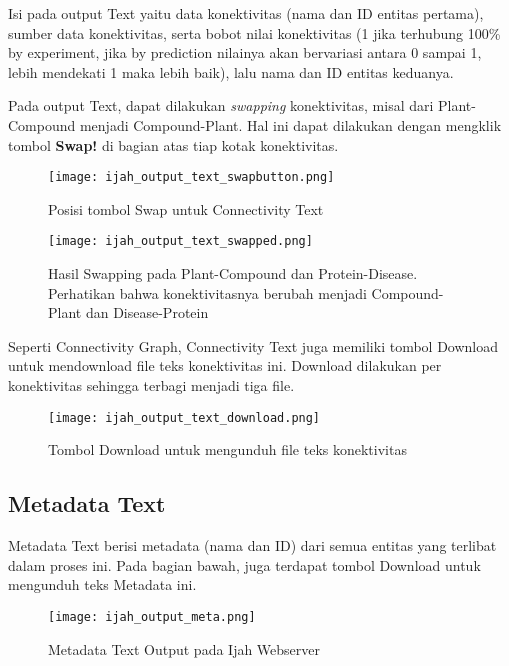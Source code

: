 	Isi pada output Text yaitu data konektivitas (nama dan ID entitas pertama), sumber data konektivitas, serta bobot nilai konektivitas (1 jika terhubung 100\% by experiment, jika by prediction nilainya akan bervariasi antara 0 sampai 1, lebih mendekati 1 maka lebih baik), lalu nama dan ID entitas keduanya.

	Pada output Text, dapat dilakukan \emph{swapping} konektivitas, misal dari Plant-Compound menjadi Compound-Plant. Hal ini dapat dilakukan dengan mengklik tombol \textbf{Swap!} di bagian atas tiap kotak konektivitas.

	\begin{figure}[H]
	\centering
	\texttt{[image: ijah\_output\_text\_swapbutton.png]}
	\caption{Posisi tombol Swap untuk Connectivity Text}
	\label{fig:ijah_output_text_swapbutton}
	\end{figure}

	\begin{figure}[H]
	\centering
	\texttt{[image: ijah\_output\_text\_swapped.png]}
	\caption{Hasil Swapping pada Plant-Compound dan Protein-Disease. Perhatikan bahwa konektivitasnya berubah menjadi Compound-Plant dan Disease-Protein}
	\label{fig:ijah_output_text_swapped}
	\end{figure}

	Seperti Connectivity Graph, Connectivity Text juga memiliki tombol Download untuk mendownload file teks konektivitas ini. Download dilakukan per konektivitas sehingga terbagi menjadi tiga file.

	\begin{figure}[H]
	\centering
	\texttt{[image: ijah\_output\_text\_download.png]}
	\caption{Tombol Download untuk mengunduh file teks konektivitas}
	\label{fig:ijah_output_text_download}
	\end{figure}
	
	\subsection{Metadata Text} \label{meta}
	Metadata Text berisi metadata (nama dan ID) dari semua entitas yang terlibat dalam proses ini. Pada bagian bawah, juga terdapat tombol Download untuk mengunduh teks Metadata ini.

	\begin{figure}[H]
	\centering
	\texttt{[image: ijah\_output\_meta.png]}
	\caption{Metadata Text Output pada Ijah Webserver}
	\label{fig:ijah_output_meta}
	\end{figure}

